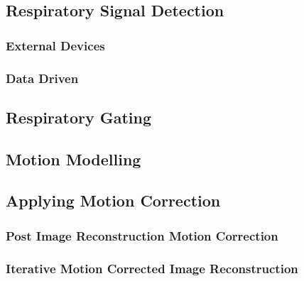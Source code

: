         \subsection{Respiratory Signal Detection} \label{respiratory_signal_detection}
            \blindtext
            
            \subsubsection{External Devices} \label{external_devices}
                \blindtext
                
            \subsubsection{Data Driven} \label{data_driven}
                \blindtext
                
        \subsection{Respiratory Gating} \label{respiratory_gating}
            \blindtext
            
        \subsection{Motion Modelling} \label{motion_modelling}
            \blindtext
        
        \subsection{Applying Motion Correction} \label{applying_motion_correction}
            \blindtext
            
            \subsubsection{Post Image Reconstruction Motion Correction} \label{post_image_reconstruction_motion_correction}
                \blindtext
                
            \subsubsection{Iterative Motion Corrected Image Reconstruction} \label{iterative_motion_corrected_image_reconstruction}
                \blindtext
    
